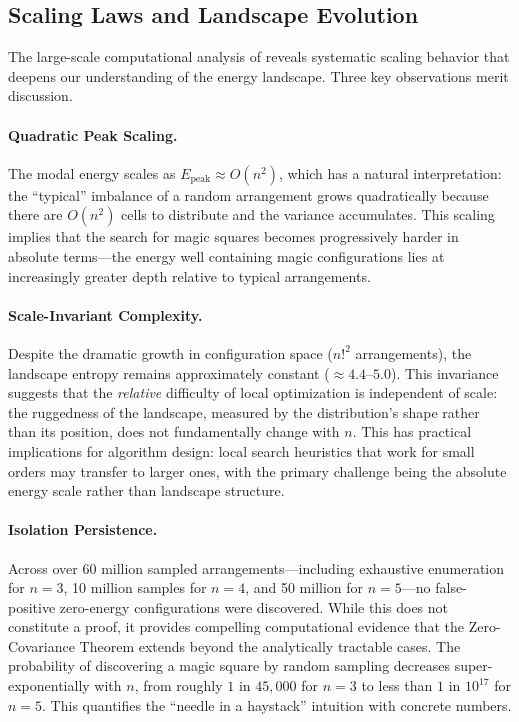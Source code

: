 \subsection{Scaling Laws and Landscape Evolution}

The large-scale computational analysis of  reveals 
systematic scaling behavior that deepens our understanding of the energy landscape.
Three key observations merit discussion.

\paragraph{Quadratic Peak Scaling.}
The modal energy scales as $E_{\text{peak}} \approx O(n^2)$,
which has a natural interpretation:
the ``typical'' imbalance of a random arrangement grows quadratically 
because there are $O(n^2)$ cells to distribute and the variance accumulates.
This scaling implies that the search for magic squares becomes progressively harder 
in absolute terms---the energy well containing magic configurations lies at increasingly 
greater depth relative to typical arrangements.

\paragraph{Scale-Invariant Complexity.}
Despite the dramatic growth in configuration space ($n!^2$ arrangements),
the landscape entropy remains approximately constant ($\approx 4.4$--$5.0$).
This invariance suggests that the \emph{relative} difficulty of local optimization 
is independent of scale: the ruggedness of the landscape, 
measured by the distribution's shape rather than its position,
does not fundamentally change with $n$.
This has practical implications for algorithm design:
local search heuristics that work for small orders may transfer to larger ones,
with the primary challenge being the absolute energy scale rather than landscape structure.

\paragraph{Isolation Persistence.}
Across over 60 million sampled arrangements---including exhaustive enumeration for $n=3$,
10 million samples for $n=4$, and 50 million for $n=5$---no false-positive zero-energy 
configurations were discovered.
While this does not constitute a proof, it provides compelling computational evidence 
that the Zero-Covariance Theorem extends beyond the analytically tractable cases.
The probability of discovering a magic square by random sampling decreases super-exponentially 
with $n$, from roughly $1$ in $45{,}000$ for $n=3$ to less than $1$ in $10^{17}$ for $n=5$.
This quantifies the ``needle in a haystack'' intuition with concrete numbers.

